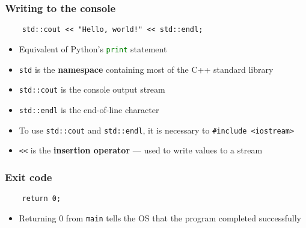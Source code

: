 \begin{frame}[fragile]
	\frametitle{Writing to the console}
	\begin{lstlisting}
    std::cout << "Hello, world!" << std::endl;
	\end{lstlisting}
	\begin{itemize}
		\item Equivalent of Python's \lstinline[language=Python]{print} statement
		\item \lstinline{std} is the \textbf{namespace} containing most of the C++ standard library
		\item \lstinline{std::cout} is the console output stream
		\item \lstinline{std::endl} is the end-of-line character
		\item To use \lstinline{std::cout} and \lstinline{std::endl}, it is necessary to
			\lstinline{#include <iostream>}
		\item \lstinline{<<} is the \textbf{insertion operator} --- used to write values to a stream
	\end{itemize}
\end{frame}

\begin{frame}[fragile]
	\frametitle{Exit code}
	\begin{lstlisting}
    return 0;
	\end{lstlisting}
	\begin{itemize}
		\item Returning 0 from \lstinline{main} tells the OS that the program completed successfully
	\end{itemize}
\end{frame}
